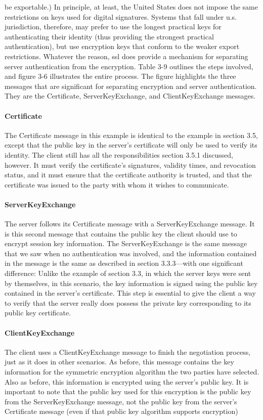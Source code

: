 be exportable.) In principle, at least, the United States does not impose the same restrictions on keys used for digital signatures. Systems
that fall under u.s. jurisdiction, therefore, may prefer to use the longest practical keys for authenticating their identity (thus providing the
strongest practical authentication), but use encryption keys that conform to the weaker export restrictions.
Whatever the reason, ssl does provide a mechanism for separating
server authentication from the encryption. Table 3-9 outlines the
steps involved, and figure 3-6 illustrates the entire process. The figure
highlights the three messages that are significant for separating encryption and server authentication. They are the Certificate,
ServerKeyExchange, and ClientKeyExchange messages.

\paragraph{Certificate}
The Certificate message in this example is identical to the example
in section 3.5, except that the public key in the server’s certificate will
only be used to verify its identity. The client still has all the responsibilities section 3.5.1 discussed, however. It must verify the certificate’s
signatures, validity times, and revocation status, and it must ensure
that the certificate authority is trusted, and that the certificate was issued to the party with whom it wishes to communicate.
\paragraph{ServerKeyExchange}
The server follows its Certificate message with a ServerKeyExchange
message. It is this second message that contains the public key the
client should use to encrypt session key information. The
ServerKeyExchange is the same message that we saw when no authentication was involved, and the information contained in the message is the same as described in section 3.3.3—with one significant
difference: Unlike the example of section 3.3, in which the server keys
were sent by themselves, in this scenario, the key information is
signed using the public key contained in the server’s certificate. This
step is essential to give the client a way to verify that the server really
does possess the private key corresponding to its public key certificate.
\paragraph{ClientKeyExchange}
The client uses a ClientKeyExchange message to finish the negotiation process, just as it does in other scenarios. As before, this message
contains the key information for the symmetric encryption algorithm
the two parties have selected. Also as before, this information is encrypted using the server’s public key. It is important to note that the
public key used for this encryption is the public key from the
ServerKeyExchange message, not the public key from the server’s
Certificate message (even if that public key algorithm supports encryption)

